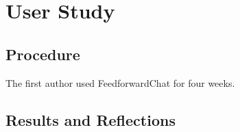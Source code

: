 \section{User Study}
\label{section:user_study}

\subsection{Procedure}

The first author used FeedforwardChat for four weeks.

\subsection{Results and Reflections}



